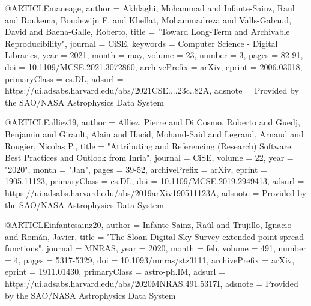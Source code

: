 %
%

@ARTICLE{maneage,
       author = {{Akhlaghi}, Mohammad and {Infante-Sainz}, Raul and
         {Roukema}, Boudewijn F. and {Khellat}, Mohammadreza and
         {Valls-Gabaud}, David and {Baena-Galle}, Roberto},
        title = "{Toward Long-Term and Archivable Reproducibility}",
      journal = {CiSE},
     keywords = {Computer Science - Digital Libraries},
         year = 2021,
        month = may,
       volume = {23},
       number = {3},
        pages = {82-91},
          doi = {10.1109/MCSE.2021.3072860},
archivePrefix = {arXiv},
       eprint = {2006.03018},
 primaryClass = {cs.DL},
       adsurl = {https://ui.adsabs.harvard.edu/abs/2021CSE....23c..82A},
      adsnote = {Provided by the SAO/NASA Astrophysics Data System}
}




@ARTICLE{alliez19,
       author = {{Alliez}, Pierre and {Di Cosmo}, Roberto and {Guedj}, Benjamin and
         {Girault}, Alain and {Hacid}, Mohand-Said and {Legrand}, Arnaud and
         {Rougier}, Nicolas P.},
        title = "{Attributing and Referencing (Research) Software: Best Practices and Outlook from Inria}",
      journal = {CiSE},
       volume = {22},
         year = "2020",
        month = "Jan",
        pages = {39-52},
archivePrefix = {arXiv},
       eprint = {1905.11123},
 primaryClass = {cs.DL},
          doi = {10.1109/MCSE.2019.2949413},
       adsurl = {https://ui.adsabs.harvard.edu/abs/2019arXiv190511123A},
      adsnote = {Provided by the SAO/NASA Astrophysics Data System}
}





@ARTICLE{infantesainz20,
       author = {{Infante-Sainz}, Ra{\'u}l and {Trujillo}, Ignacio and
         {Rom{\'a}n}, Javier},
        title = "{The Sloan Digital Sky Survey extended point spread functions}",
      journal = {MNRAS},
         year = 2020,
        month = feb,
       volume = {491},
       number = {4},
        pages = {5317-5329},
          doi = {10.1093/mnras/stz3111},
archivePrefix = {arXiv},
       eprint = {1911.01430},
 primaryClass = {astro-ph.IM},
       adsurl = {https://ui.adsabs.harvard.edu/abs/2020MNRAS.491.5317I},
      adsnote = {Provided by the SAO/NASA Astrophysics Data System}
}





